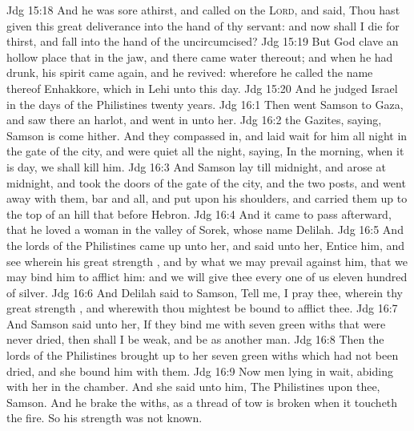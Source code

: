 \vs Jdg 15:18 And he was sore athirst, and called on the \textsc{Lord}, and said, Thou hast given this great deliverance into the hand of thy servant: and now shall I die for thirst, and fall into the hand of the uncircumcised?
\vs Jdg 15:19 But God clave an hollow place that  in the jaw, and there came water thereout; and when he had drunk, his spirit came again, and he revived: wherefore he called the name thereof Enhakkore, which  in Lehi unto this day.
\vs Jdg 15:20 And he judged Israel in the days of the Philistines twenty years.
\vs Jdg 16:1 Then went Samson to Gaza, and saw there an harlot, and went in unto her.
\vs Jdg 16:2  the Gazites, saying, Samson is come hither. And they compassed  in, and laid wait for him all night in the gate of the city, and were quiet all the night, saying, In the morning, when it is day, we shall kill him.
\vs Jdg 16:3 And Samson lay till midnight, and arose at midnight, and took the doors of the gate of the city, and the two posts, and went away with them, bar and all, and put  upon his shoulders, and carried them up to the top of an hill that  before Hebron.
\vs Jdg 16:4 And it came to pass afterward, that he loved a woman in the valley of Sorek, whose name  Delilah.
\vs Jdg 16:5 And the lords of the Philistines came up unto her, and said unto her, Entice him, and see wherein his great strength , and by what  we may prevail against him, that we may bind him to afflict him: and we will give thee every one of us eleven hundred  of silver.
\vs Jdg 16:6 And Delilah said to Samson, Tell me, I pray thee, wherein thy great strength , and wherewith thou mightest be bound to afflict thee.
\vs Jdg 16:7 And Samson said unto her, If they bind me with seven green withs that were never dried, then shall I be weak, and be as another man.
\vs Jdg 16:8 Then the lords of the Philistines brought up to her seven green withs which had not been dried, and she bound him with them.
\vs Jdg 16:9 Now  men lying in wait, abiding with her in the chamber. And she said unto him, The Philistines  upon thee, Samson. And he brake the withs, as a thread of tow is broken when it toucheth the fire. So his strength was not known.
